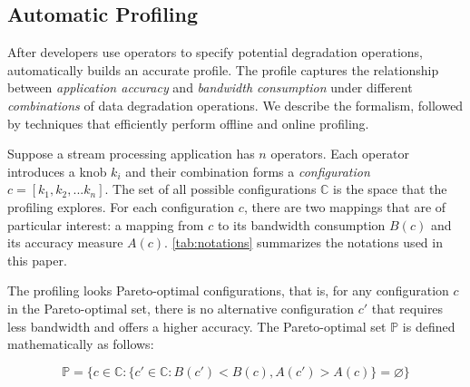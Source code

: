 \subsection{Automatic Profiling}
\label{sec:automatic-profiling}

After developers use \maybe{} operators to specify potential degradation
operations, \sysname{} automatically builds an accurate profile. The profile
captures the relationship between \textit{application accuracy} and \textit{bandwidth
consumption}
under different \textit{combinations} of data degradation operations. We describe the
formalism, followed by techniques that efficiently perform offline and online
profiling.

 Suppose a stream processing application has $n$
\maybe{} operators. Each operator introduces a knob $k_i$ and their combination
forms a \textit{configuration} $c = [k_{1}, k_{2}, ... k_{n}]$. The set of all
possible configurations $\mathbb{C}$ is the space that the profiling
explores. For each configuration $c$, there are two mappings that are of
particular interest: a mapping from $c$ to its bandwidth consumption $B(c)$ and
its accuracy measure $A(c)$. \autoref{tab:notations} summarizes the notations
used in this paper.

The profiling looks Pareto-optimal configurations, that is, for any
configuration $c$ in the Pareto-optimal set, there is no alternative
configuration $c'$ that requires less bandwidth and offers a higher
accuracy. The Pareto-optimal set $\mathbb{P}$ is defined mathematically as
follows:

{\small \vspace{-1em}
  \begin{equation}
  \mathbb{P} = \{ c \in \mathbb{C} : \{ c' \in \mathbb{C}: B(c') < B(c),
  A(c') > A(c) \} = \varnothing\}
  \label{eq:pareto}
\end{equation}
}%

